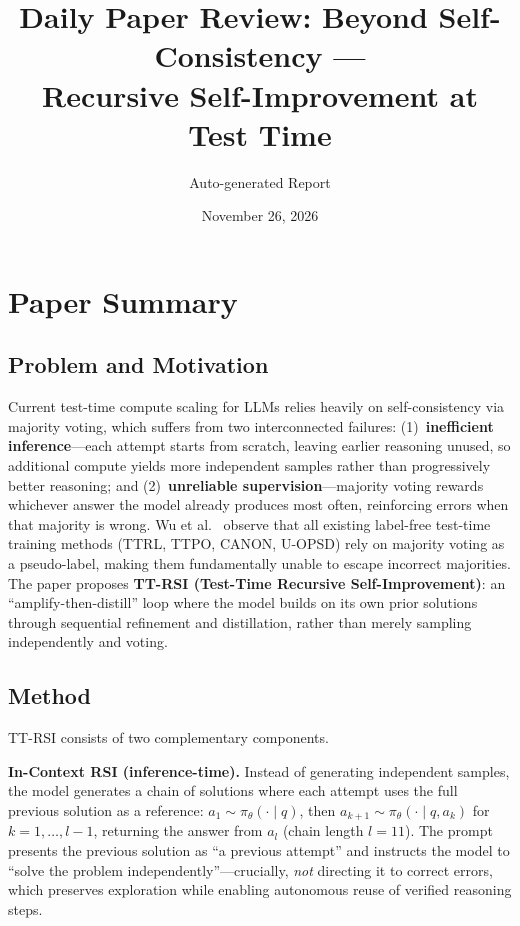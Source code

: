\documentclass[11pt,a4paper]{article}
\title{Daily Paper Review: Beyond Self-Consistency ---\\Recursive Self-Improvement at Test Time}
\author{Auto-generated Report}
\date{November 26, 2026}
\begin{document}
\maketitle

\section{Paper Summary}

\subsection{Problem and Motivation}
Current test-time compute scaling for LLMs relies heavily on self-consistency via majority voting, which suffers from two interconnected failures: (1)~\textbf{inefficient inference}---each attempt starts from scratch, leaving earlier reasoning unused, so additional compute yields more independent samples rather than progressively better reasoning; and (2)~\textbf{unreliable supervision}---majority voting rewards whichever answer the model already produces most often, reinforcing errors when that majority is wrong. Wu et al.~\cite{wu2026ttrsi} observe that all existing label-free test-time training methods (TTRL, TTPO, CANON, U-OPSD) rely on majority voting as a pseudo-label, making them fundamentally unable to escape incorrect majorities. The paper proposes \textbf{TT-RSI (Test-Time Recursive Self-Improvement)}: an ``amplify-then-distill'' loop where the model builds on its own prior solutions through sequential refinement and distillation, rather than merely sampling independently and voting.

\subsection{Method}
TT-RSI consists of two complementary components.

\textbf{In-Context RSI (inference-time).} Instead of generating independent samples, the model generates a chain of solutions where each attempt uses the full previous solution as a reference: $a_1 \sim \pi_\theta(\cdot \mid q)$, then $a_{k+1} \sim \pi_\theta(\cdot \mid q, a_k)$ for $k = 1, \ldots, l{-}1$, returning the answer from $a_l$ (chain length $l{=}11$). The prompt presents the previous solution as ``a previous attempt'' and instructs the model to ``solve the problem independently''---crucially, \emph{not} directing it to correct errors, which preserves exploration while enabling autonomous reuse of verified reasoning steps.
\end{document}
